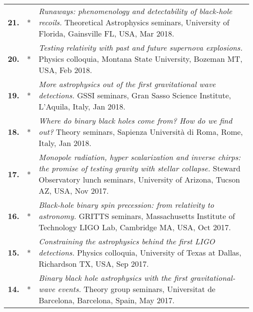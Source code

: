 \documentclass[a4paper]{moderncv}
\begin{document}
{\begin{longtable}{rp{0.4cm}p{15.8cm}}
%
\textbf{21.} & *& \textit{Runaways: phenomenology and detectability of black-hole recoils.}
\newline{} 
Theoretical Astrophysics seminars, University of Florida, Gainsville FL, USA, Mar 2018.
\vspace{0.05cm}\\
%
\textbf{20.} & *& \textit{Testing relativity with past and future supernova explosions.}
\newline{} 
Physics colloquia, Montana State University, Bozeman MT, USA, Feb 2018.
\vspace{0.05cm}\\
%
\textbf{19.} & *& \textit{More astrophysics out of the first gravitational wave detections.}
\newline{} 
GSSI seminars, Gran Sasso Science Institute, L'Aquila, Italy, Jan 2018.
\vspace{0.05cm}\\
%
\textbf{18.} & *& \textit{Where do binary black holes come from? How do we find out?}
\newline{} 
Theory seminars, Sapienza Universit\`a di Roma, Rome, Italy, Jan 2018.
\vspace{0.05cm}\\
%
\textbf{17.} & *& \textit{Monopole radiation, hyper scalarization and inverse chirps: the promise of testing gravity with stellar collapse.}
\newline{} 
Steward Observatory lunch seminars, University of Arizona, Tucson AZ, USA, Nov 2017.
\vspace{0.05cm}\\
%
\textbf{16.} & *& \textit{Black-hole binary spin precession: from relativity to astronomy.}
\newline{} 
GRITTS seminars, Massachusetts Institute of Technology LIGO Lab, Cambridge MA, USA, Oct 2017.
\vspace{0.05cm}\\
%
\textbf{15.} & *& \textit{Constraining the astrophysics behind the first LIGO detections.}
\newline{} 
Physics colloquia, University of Texas at Dallas, Richardson TX, USA, Sep 2017.
\vspace{0.05cm}\\
%
\textbf{14.} & *& \textit{Binary black hole astrophysics with the first gravitational-wave events.}
\newline{} 
Theory group seminars, Universitat de Barcelona, Barcelona, Spain, May 2017.
\vspace{0.05cm}\\

\end{longtable}}
\end{document}
